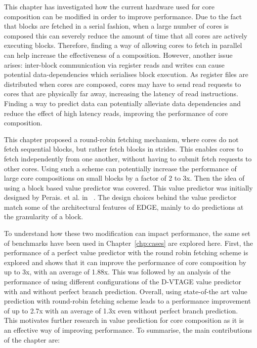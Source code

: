 This chapter has investigated how the current hardware used for core composition can be modified in order to improve performance.
Due to the fact that blocks are fetched in a serial fashion, when a large number of cores is composed this can severely reduce the amount of time that all cores are actively executing blocks.
Therefore, finding a way of allowing cores to fetch in parallel can help increase the effectiveness of a composition.
However, another issue arises: inter-block communication via register reads and writes can cause potential data-dependencies which serialises block execution.
As register files are distributed when cores are composed, cores may have to send read requests to cores that are physically far away, increasing the latency of read instructions.
Finding a way to predict data can potentially alleviate data dependencies and reduce the effect of high latency reads, improving the performance of core composition.

This chapter proposed a round-robin fetching mechanism, where cores do not fetch sequential blocks, but rather fetch blocks in strides.
This enables cores to fetch independently from one another, without having to submit fetch requests to other cores.
Using such a scheme can potentially increase the performance of large core compositions on small blocks by a factor of 2 to 3x.
Then the idea of using a block based value predictor was covered.
This value predictor was initially designed by Perais. et al. in ~\cite{peraisVTAGE2014, peraisBeBop2015}.
The design choices behind the value predictor match some of the architectural features of EDGE, mainly to do predictions at the granularity of a block.

To understand how these two modification can impact performance, the same set of benchmarks have been used in Chapter~\ref{chp:cases} are explored here.
First, the performance of a perfect value predictor with the round robin fetching scheme is explored and shows that it can improve the performance of core composition by up to 3x, with an average of 1.88x.
This was followed by an analysis of the performance of using different configurations of the D-VTAGE value predictor with and without perfect branch prediction.
Overall, using state-of-the art value prediction with round-robin fetching scheme leads to a performance improvement of up to 2.7x with an average of 1.3x even without perfect branch prediction.
This motivates further research in value prediction for core composition as it is an effective way of improving performance.
To summarise, the main contributions of the chapter are:


